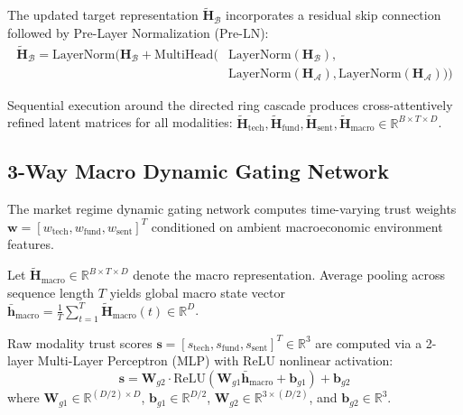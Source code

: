 The updated target representation $\tilde{\mathbf{H}}_{\mathcal{B}}$ incorporates a residual skip connection followed by Pre-Layer Normalization ($\text{Pre-LN}$):
\begin{equation}
\begin{aligned}
\tilde{\mathbf{H}}_{\mathcal{B}} = \text{LayerNorm}\Big( \mathbf{H}_{\mathcal{B}} + \text{MultiHead}\big( &\text{LayerNorm}(\mathbf{H}_{\mathcal{B}}), \\
&\text{LayerNorm}(\mathbf{H}_{\mathcal{A}}), \text{LayerNorm}(\mathbf{H}_{\mathcal{A}}) \big) \Big)
\end{aligned}
\label{eq:ch3_ring_residual_ln}
\end{equation}

Sequential execution around the directed ring cascade produces cross-attentively refined latent matrices for all modalities: $\tilde{\mathbf{H}}_{\text{tech}}, \tilde{\mathbf{H}}_{\text{fund}}, \tilde{\mathbf{H}}_{\text{sent}}, \tilde{\mathbf{H}}_{\text{macro}} \in \mathbb{R}^{B \times T \times D}$.

\subsection{3-Way Macro Dynamic Gating Network}
\label{subsec:ch3_dynamic_gating}

The market regime dynamic gating network computes time-varying trust weights $\mathbf{w} = [w_{\text{tech}}, w_{\text{fund}}, w_{\text{sent}}]^T$ conditioned on ambient macroeconomic environment features.

Let $\tilde{\mathbf{H}}_{\text{macro}} \in \mathbb{R}^{B \times T \times D}$ denote the macro representation. Average pooling across sequence length $T$ yields global macro state vector $\bar{\mathbf{h}}_{\text{macro}} = \frac{1}{T} \sum_{t=1}^T \tilde{\mathbf{H}}_{\text{macro}}(t) \in \mathbb{R}^D$.

Raw modality trust scores $\mathbf{s} = [s_{\text{tech}}, s_{\text{fund}}, s_{\text{sent}}]^T \in \mathbb{R}^3$ are computed via a 2-layer Multi-Layer Perceptron (MLP) with ReLU nonlinear activation:
\begin{equation}
\mathbf{s} = \mathbf{W}_{g2} \cdot \text{ReLU}\left( \mathbf{W}_{g1} \bar{\mathbf{h}}_{\text{macro}} + \mathbf{b}_{g1} \right) + \mathbf{b}_{g2}
\label{eq:ch3_gating_mlp}
\end{equation}
where $\mathbf{W}_{g1} \in \mathbb{R}^{(D/2) \times D}$, $\mathbf{b}_{g1} \in \mathbb{R}^{D/2}$, $\mathbf{W}_{g2} \in \mathbb{R}^{3 \times (D/2)}$, and $\mathbf{b}_{g2} \in \mathbb{R}^3$.

